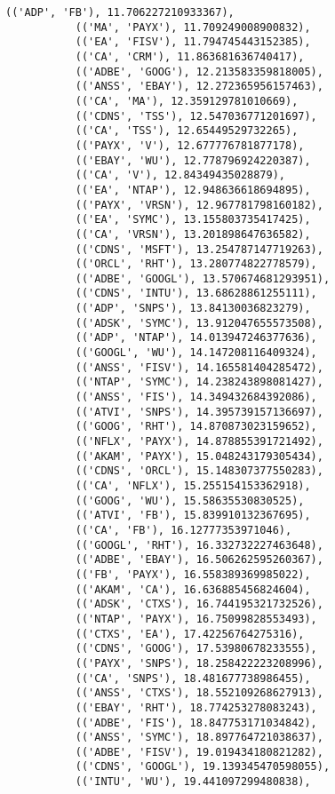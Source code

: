 \documentclass[11pt]{article}
\begin{document}
\begin{Verbatim}[commandchars=\\\{\}]
           (('ADP', 'FB'), 11.706227210933367),
           (('MA', 'PAYX'), 11.709249008900832),
           (('EA', 'FISV'), 11.794745443152385),
           (('CA', 'CRM'), 11.863681636740417),
           (('ADBE', 'GOOG'), 12.213583359818005),
           (('ANSS', 'EBAY'), 12.272365956157463),
           (('CA', 'MA'), 12.359129781010669),
           (('CDNS', 'TSS'), 12.547036771201697),
           (('CA', 'TSS'), 12.65449529732265),
           (('PAYX', 'V'), 12.677776781877178),
           (('EBAY', 'WU'), 12.778796924220387),
           (('CA', 'V'), 12.84349435028879),
           (('EA', 'NTAP'), 12.948636618694895),
           (('PAYX', 'VRSN'), 12.967781798160182),
           (('EA', 'SYMC'), 13.155803735417425),
           (('CA', 'VRSN'), 13.201898647636582),
           (('CDNS', 'MSFT'), 13.254787147719263),
           (('ORCL', 'RHT'), 13.280774822778579),
           (('ADBE', 'GOOGL'), 13.570674681293951),
           (('CDNS', 'INTU'), 13.68628861255111),
           (('ADP', 'SNPS'), 13.84130036823279),
           (('ADSK', 'SYMC'), 13.912047655573508),
           (('ADP', 'NTAP'), 14.013947246377636),
           (('GOOGL', 'WU'), 14.147208116409324),
           (('ANSS', 'FISV'), 14.165581404285472),
           (('NTAP', 'SYMC'), 14.238243898081427),
           (('ANSS', 'FIS'), 14.349432684392086),
           (('ATVI', 'SNPS'), 14.395739157136697),
           (('GOOG', 'RHT'), 14.870873023159652),
           (('NFLX', 'PAYX'), 14.878855391721492),
           (('AKAM', 'PAYX'), 15.048243179305434),
           (('CDNS', 'ORCL'), 15.148307377550283),
           (('CA', 'NFLX'), 15.255154153362918),
           (('GOOG', 'WU'), 15.58635530830525),
           (('ATVI', 'FB'), 15.839910132367695),
           (('CA', 'FB'), 16.12777353971046),
           (('GOOGL', 'RHT'), 16.332732227463648),
           (('ADBE', 'EBAY'), 16.506262595260367),
           (('FB', 'PAYX'), 16.558389369985022),
           (('AKAM', 'CA'), 16.636885456824604),
           (('ADSK', 'CTXS'), 16.744195321732526),
           (('NTAP', 'PAYX'), 16.75099828553493),
           (('CTXS', 'EA'), 17.42256764275316),
           (('CDNS', 'GOOG'), 17.53980678233555),
           (('PAYX', 'SNPS'), 18.258422223208996),
           (('CA', 'SNPS'), 18.481677738986455),
           (('ANSS', 'CTXS'), 18.552109268627913),
           (('EBAY', 'RHT'), 18.774253278083243),
           (('ADBE', 'FIS'), 18.847753171034842),
           (('ANSS', 'SYMC'), 18.897764721038637),
           (('ADBE', 'FISV'), 19.019434180821282),
           (('CDNS', 'GOOGL'), 19.139345470598055),
           (('INTU', 'WU'), 19.441097299480838),

\end{Verbatim}
\end{document}
